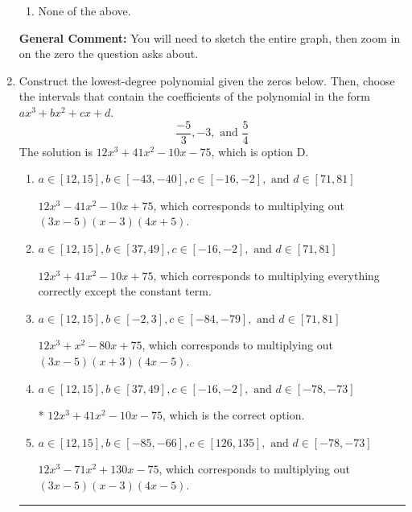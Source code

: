 \documentclass{extbook}[14pt]
\newcommand{\litem}[1]{\item #1

\rule{\textwidth}{0.4pt}}
\begin{document}
\begin{enumerate}
{\begin{enumerate}[label=\Alph*.]
\item None of the above.\end{enumerate}
\textbf{General Comment:} You will need to sketch the entire graph, then zoom in on the zero the question asks about.
}
\litem{
Construct the lowest-degree polynomial given the zeros below. Then, choose the intervals that contain the coefficients of the polynomial in the form $ax^3+bx^2+cx+d$.
\[ \frac{-5}{3}, -3, \text{ and } \frac{5}{4} \]The solution is \( 12x^{3} +41 x^{2} -10 x -75 \), which is option D.\begin{enumerate}[label=\Alph*.]
\item \( a \in [12, 15], b \in [-43, -40], c \in [-16, -2], \text{ and } d \in [71, 81] \)

$12x^{3} -41 x^{2} -10 x + 75$, which corresponds to multiplying out $(3x -5)(x -3)(4x + 5)$.
\item \( a \in [12, 15], b \in [37, 49], c \in [-16, -2], \text{ and } d \in [71, 81] \)

$12x^{3} +41 x^{2} -10 x + 75$, which corresponds to multiplying everything correctly except the constant term.
\item \( a \in [12, 15], b \in [-2, 3], c \in [-84, -79], \text{ and } d \in [71, 81] \)

$12x^{3} + x^{2} -80 x + 75$, which corresponds to multiplying out $(3x -5)(x + 3)(4x -5)$.
\item \( a \in [12, 15], b \in [37, 49], c \in [-16, -2], \text{ and } d \in [-78, -73] \)

* $12x^{3} +41 x^{2} -10 x -75$, which is the correct option.
\item \( a \in [12, 15], b \in [-85, -66], c \in [126, 135], \text{ and } d \in [-78, -73] \)

$12x^{3} -71 x^{2} +130 x -75$, which corresponds to multiplying out $(3x -5)(x -3)(4x -5)$.
\end{enumerate}

}
\end{enumerate}
\end{document}
